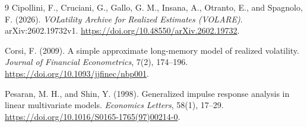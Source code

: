 \documentclass[11pt,letterpaper]{article}
\begin{document}
\begin{thebibliography}{9}
Cipollini, F., Cruciani, G., Gallo, G. M., Insana, A., Otranto, E., and
Spagnolo, F. (2026).
\textit{VOLatility Archive for Realized Estimates (VOLARE)}.
arXiv:2602.19732v1.
\url{https://doi.org/10.48550/arXiv.2602.19732}.

Corsi, F. (2009).
A simple approximate long-memory model of realized volatility.
\textit{Journal of Financial Econometrics}, 7(2), 174--196.
\url{https://doi.org/10.1093/jjfinec/nbp001}.

Pesaran, M. H., and Shin, Y. (1998).
Generalized impulse response analysis in linear multivariate models.
\textit{Economics Letters}, 58(1), 17--29.
\url{https://doi.org/10.1016/S0165-1765(97)00214-0}.
\end{thebibliography}
\end{document}

